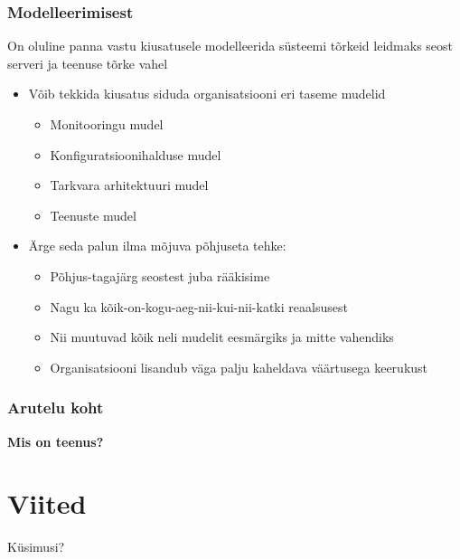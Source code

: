\begin{frame}[fragile]
  \frametitle{Modelleerimisest}
	On oluline panna vastu kiusatusele modelleerida süsteemi tõrkeid leidmaks seost serveri ja teenuse tõrke vahel
		\begin{itemize}
			\item Võib tekkida kiusatus siduda organisatsiooni eri taseme mudelid
			\begin{itemize}
				\item Monitooringu mudel
				\item Konfiguratsioonihalduse mudel
				\item Tarkvara arhitektuuri mudel
				\item Teenuste mudel
			\end{itemize}
			\item Ärge seda palun ilma mõjuva põhjuseta tehke:
			\begin{itemize}
				\item Põhjus-tagajärg seostest juba rääkisime
				\item Nagu ka kõik-on-kogu-aeg-nii-kui-nii-katki reaalsusest
				\item Nii muutuvad kõik neli mudelit eesmärgiks ja mitte vahendiks
				\item Organisatsiooni lisandub väga palju kaheldava väärtusega keerukust
			\end{itemize}
			
		\end{itemize}		
\end{frame}

\begin{frame}[fragile]
  \frametitle{Arutelu koht}
		\begin{center}
			\textbf{Mis on teenus?}
		\end{center}
\end{frame}


\section{Viited}

\begin{frame}[t,allowframebreaks,]
  	
	 

\end{frame}

\begin{frame}[plain]
	\begin{center}Küsimusi?\end{center}
\end{frame}


